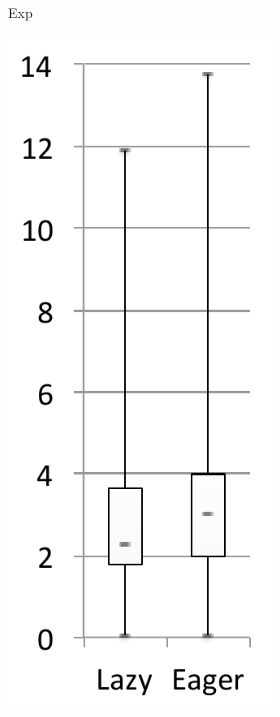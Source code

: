 \documentclass[sigplan,10pt,review,anonymous]{acmart}\settopmatter{printfolios=true,printccs=false,printacmref=false}
\begin{document}
\begin{figure}[bth]
\begin{subfigure}[b]{.48\textwidth}
\begin{subfigure}[b]{.24\textwidth}
		\caption{Exp}
   	\end{subfigure}	
	\begin{subfigure}[b]{.24\textwidth}
		\includegraphics[width=\linewidth]{figures/netBeansExpCache} 

\end{subfigure}
\end{subfigure}
\end{figure}
\end{document}
